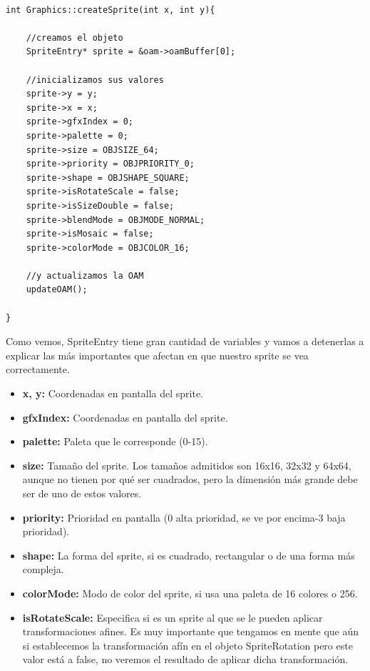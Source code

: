 \begin{lstlisting}[caption={Declaración de la copia de la OAM y}, label={oamupdate}]

int Graphics::createSprite(int x, int y){

    //creamos el objeto
    SpriteEntry* sprite = &oam->oamBuffer[0];

    //inicializamos sus valores
    sprite->y = y;
    sprite->x = x;
    sprite->gfxIndex = 0;
    sprite->palette = 0;
    sprite->size = OBJSIZE_64;
    sprite->priority = OBJPRIORITY_0;
    sprite->shape = OBJSHAPE_SQUARE;
    sprite->isRotateScale = false;
    sprite->isSizeDouble = false;
    sprite->blendMode = OBJMODE_NORMAL;
    sprite->isMosaic = false;
    sprite->colorMode = OBJCOLOR_16;
    
    //y actualizamos la OAM
    updateOAM();
    
}
\end{lstlisting}

\vspace{0.5cm}

Como vemos, SpriteEntry tiene gran cantidad de variables y vamos a detenerlas a explicar las más importantes que afectan en que nuestro sprite se vea correctamente.

\vspace{0.5cm}

\begin{itemize}
 \item \textbf{x, y:} Coordenadas en pantalla del sprite.
\item \textbf{gfxIndex:} Coordenadas en pantalla del sprite.
\item \textbf{palette:} Paleta que le corresponde (0-15).
\item \textbf{size:} Tamaño del sprite. Los tamaños admitidos son 16x16, 32x32 y 64x64, aunque no tienen por qué ser cuadrados, pero la dimensión más grande debe ser de uno de estos valores.
\item \textbf{priority:} Prioridad en pantalla (0 alta prioridad, se ve por encima-3 baja prioridad).
\item \textbf{shape:} La forma del sprite, si es cuadrado, rectangular o de una forma más compleja.
 \item \textbf{colorMode:} Modo de color del sprite, si usa una paleta de 16 colores o 256.
 \item \textbf{isRotateScale:} Especifica si es un sprite al que se le pueden aplicar transformaciones afines. Es muy importante que tengamos en mente que aún si establecemos la transformación afín en el objeto SpriteRotation pero este valor está a false, no veremos el resultado de aplicar dicha transformación.
\end{itemize}

